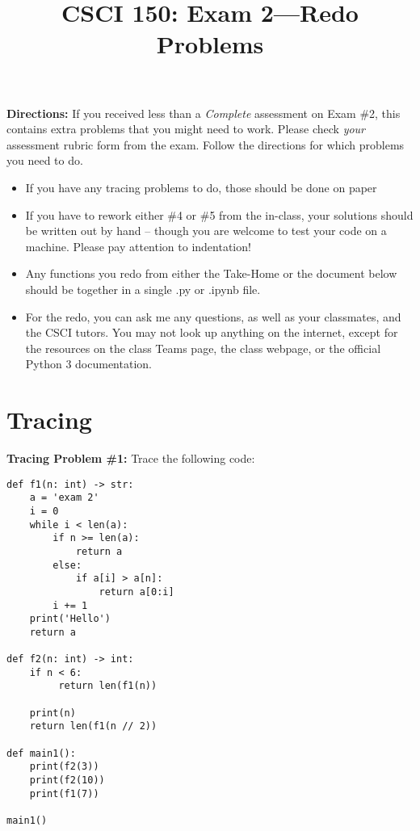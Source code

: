 \documentclass{article}
\begin{document}
\title{CSCI 150: Exam 2---Redo Problems}
\author{}
\date{}

\maketitle

\thispagestyle{empty}

\textbf{Directions:} If you received less than a \emph{Complete}
assessment on Exam \#2, this contains extra problems that you might
need to work. Please check \emph{your} assessment rubric form from the
exam. Follow the directions for which problems you need to do.

\begin{itemize}
  \item If you have any tracing problems to do, those should be done on paper
  \item If you have to rework either \#4 or \#5 from the in-class,
    your solutions should be written out by hand -- though you are
    welcome to test your code on a machine. Please pay attention to
    indentation!
  \item Any functions you redo from either the Take-Home or the
    document below should be together in a single .py or .ipynb file.
  \item For the redo, you can ask me any questions, as well as your
    classmates, and the CSCI tutors. You may not look up anything on
    the internet, except for the resources on the class Teams page,
    the class webpage, or the official Python 3 documentation.
\end{itemize}


  \vspace{0.3in}





\newpage

\section*{Tracing}

\textbf{Tracing Problem \#1:}  Trace the following code:

\vspace{0.15in}

\begin{verbatim}
def f1(n: int) -> str:
    a = 'exam 2'
    i = 0
    while i < len(a):
        if n >= len(a):
            return a
        else:
            if a[i] > a[n]:
                return a[0:i]
        i += 1
    print('Hello')
    return a

def f2(n: int) -> int:
    if n < 6:
         return len(f1(n))

    print(n)
    return len(f1(n // 2))

def main1():
    print(f2(3))
    print(f2(10))
    print(f1(7))

main1()
\end{verbatim}
\end{document}
